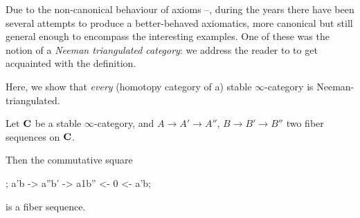 \begin{remark}
Due to the non\hyp{}canonical behaviour of axioms --, during the years there have been several attempts to produce a better\hyp{}behaved axiomatics, more canonical but still general enough to encompass the interesting examples. One of these was the notion of a \emph{Neeman triangulated category}: we address the reader to \cite{Neeman1991221} to get acquainted with the definition.

Here, we show that \emph{every} (homotopy category of a) stable $\infty$\hyp{}category is Neeman\hyp{}triangulated.
\begin{proposition}
Let $\textbf{C}$ be a stable $\infty$\hyp{}category, and $A\to A'\to A''$, $B\to B'\to B''$ two fiber sequences on $\textbf{C}$.

Then the commutative square
\begin{center}
\begin{kD}
;
\mor a'b -> a''b' -> a1b'' <- 0 <- a'b;
\end{kD}
\end{center} 
is a fiber sequence.
\end{proposition}
\end{remark}
